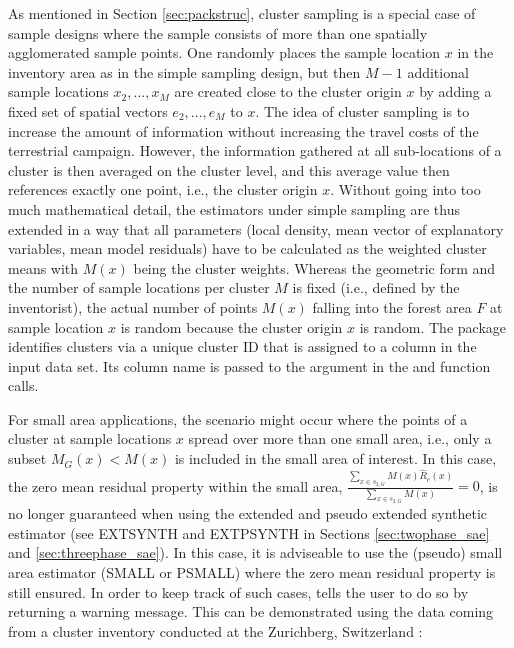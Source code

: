 As mentioned in Section \ref{sec:packstruc}, cluster sampling is a special case of sample designs where the sample consists of more than one spatially agglomerated sample points. One randomly places the sample location $x$ in the inventory area as in the simple sampling design, but then $M-1$ additional sample locations $x_2,...,x_M$ are created close to the cluster origin $x$ by adding a fixed set of spatial vectors $e_2,...,e_M$ to $x$. The idea of cluster sampling is to increase the amount of information without increasing the travel costs of the terrestrial campaign. However, the information gathered at all sub-locations of a cluster is then averaged on the cluster level, and this average value then references exactly one point, i.e., the cluster origin $x$. Without going into too much mathematical detail, the estimators under simple sampling are thus extended in a way that all parameters (local density, mean vector of explanatory variables, mean model residuals) have to be calculated as the weighted cluster means with $M(x)$ being the cluster weights. Whereas the geometric form and the number of sample locations per cluster $M$ is fixed (i.e., defined by the inventorist), the actual number of points $M(x)$ falling into the forest area $F$ at sample location $x$ is random because the cluster origin $x$ is random. The  package identifies clusters via a unique cluster ID that is assigned to a column in the input data set. Its column name is passed to the argument  in the  and  function calls.

For small area applications, the scenario might occur where the points of a cluster at sample locations $x$ spread over more than one small area, i.e., only a subset $M_{G}(x) < M(x)$ is included in the small area of interest. In this case, the zero mean residual property within the small area, $\frac{\sum_{x \in s_{2,G}}M(x)\hat{R}_{c}(x)}{\sum_{x \in s_{2,G}}M(x)}=0$, is no longer guaranteed when using the extended and pseudo extended synthetic estimator (see EXTSYNTH and EXTPSYNTH in Sections \ref{sec:twophase_sae} and \ref{sec:threephase_sae}). In this case, it is adviseable to use the (pseudo) small area estimator (SMALL or PSMALL) where the zero mean residual property is still ensured. In order to keep track of such cases,  tells the user to do so by returning a warning message. This can be demonstrated using the  data coming from a cluster inventory conducted at the Zurichberg, Switzerland \citep{mandallaz1993}:

